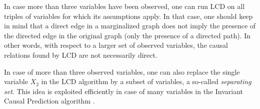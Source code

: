 In case more than three variables have been observed, one can run LCD on all triples of variables for which its assumptions apply.
In that case, one should keep in mind that a direct edge in a marginalized graph does not imply the presence of the directed 
edge in the original graph (only the presence of a directed path). In other words, with respect to a larger set of observed variables, 
the causal relations found by LCD are not necessarily direct.

In case of more than three observed variables, one can also replace the single variable $X_2$ in the LCD algorithm by a subset
of variables, a so-called \emph{separating set}. This idea is exploited efficiently in case of many variables in the Invariant Causal Prediction algorithm \cite{ICP2016}.


